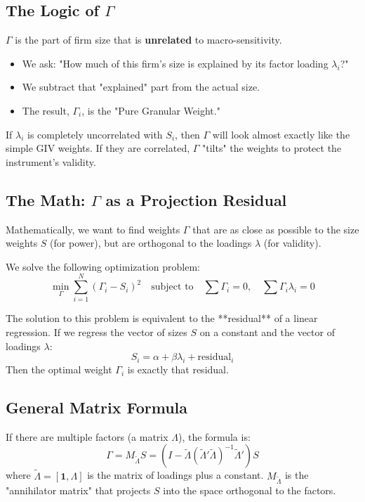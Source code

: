 \documentclass[12pt]{article}
\begin{document}
\subsection{The Logic of $\Gamma$}
$\Gamma$ is the part of firm size that is \textbf{unrelated} to macro-sensitivity.
\begin{itemize}
    \item We ask: "How much of this firm's size is explained by its factor loading $\lambda_i$?"
    \item We subtract that "explained" part from the actual size.
    \item The result, $\Gamma_i$, is the "Pure Granular Weight."
\end{itemize}
If $\lambda_i$ is completely uncorrelated with $S_i$, then $\Gamma$ will look almost exactly like the simple GIV weights. If they are correlated, $\Gamma$ "tilts" the weights to protect the instrument's validity.

\subsection{The Math: $\Gamma$ as a Projection Residual}

Mathematically, we want to find weights $\Gamma$ that are as close as possible to the size weights $S$ (for power), but are orthogonal to the loadings $\lambda$ (for validity).

We solve the following optimization problem:
\begin{equation}
    \min_{\Gamma} \sum_{i=1}^N (\Gamma_i - S_i)^2 \quad \text{subject to} \quad \sum \Gamma_i = 0, \quad \sum \Gamma_i \lambda_i = 0
\end{equation}

The solution to this problem is equivalent to the **residual** of a linear regression. If we regress the vector of sizes $S$ on a constant and the vector of loadings $\lambda$:
\begin{equation}
    S_i = \alpha + \beta \lambda_i + \text{residual}_i
\end{equation}
Then the optimal weight $\Gamma_i$ is exactly that residual.

\subsection{General Matrix Formula}
If there are multiple factors (a matrix $\Lambda$), the formula is:
\begin{equation}
    \Gamma = M_{\tilde{\Lambda}} S = (I - \tilde{\Lambda} (\tilde{\Lambda}' \tilde{\Lambda})^{-1} \tilde{\Lambda}') S
\end{equation}
where $\tilde{\Lambda} = [\mathbf{1}, \Lambda]$ is the matrix of loadings plus a constant. $M_{\tilde{\Lambda}}$ is the "annihilator matrix" that projects $S$ into the space orthogonal to the factors.
\end{document}
